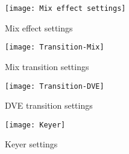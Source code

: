 \documentclass[../main.tex]{subfiles}
\begin{document}
\begin{figure}[htbp]
        \centering
        \texttt{[image: Mix effect settings]}
        \caption{Mix effect settings}
        \label{fig:mix_effect_settings}
\end{figure}

\begin{figure}[htbp]
        \centering
        \texttt{[image: Transition-Mix]}
        \caption{Mix transition settings}
        \label{fig:mix_effect_mix}
\end{figure}

\begin{figure}[htbp]
        \centering
        \texttt{[image: Transition-DVE]}
        \caption{DVE transition settings}
        \label{fig:mix_effect_dve}
\end{figure}

\begin{figure}[htbp]
        \centering
        \texttt{[image: Keyer]}
        \caption{Keyer settings}
        \label{fig:mix_effect_keyer}
\end{figure}
\end{document}
